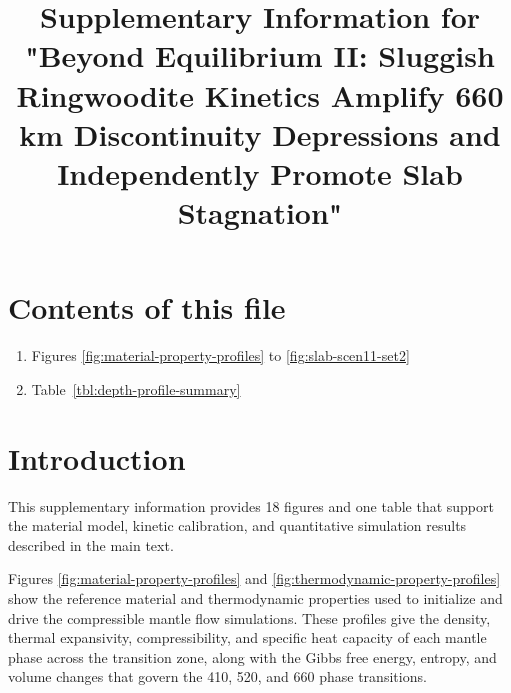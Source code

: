 \documentclass[final]{agujournal2019}
\providecommand{\tightlist}{\setlength{\itemsep}{0pt}\setlength{\parskip}{0pt}}
\let\oldtitle\title
\renewcommand{\title}[1]{\oldtitle{#1}\thispagestyle{front}}
\begin{document}
\title{Supplementary Information for "Beyond Equilibrium II: Sluggish
Ringwoodite Kinetics Amplify 660 km Discontinuity Depressions and
Independently Promote Slab Stagnation"}




\section*{Contents of this file}\label{sec:contents}

\begin{enumerate}
\def\labelenumi{\arabic{enumi}.}
\tightlist
\item
  Figures \ref{fig:material-property-profiles} to
  \ref{fig:slab-scen11-set2}
\item
  Table~\ref{tbl:depth-profile-summary}
\end{enumerate}

\clearpage

\section*{Introduction}\label{sec:introduction}

This supplementary information provides 18 figures and one table that
support the material model, kinetic calibration, and quantitative
simulation results described in the main text.

Figures \ref{fig:material-property-profiles} and
\ref{fig:thermodynamic-property-profiles} show the reference material
and thermodynamic properties used to initialize and drive the
compressible mantle flow simulations. These profiles give the density,
thermal expansivity, compressibility, and specific heat capacity of each
mantle phase across the transition zone, along with the Gibbs free
energy, entropy, and volume changes that govern the 410, 520, and 660
phase transitions.
\end{document}
